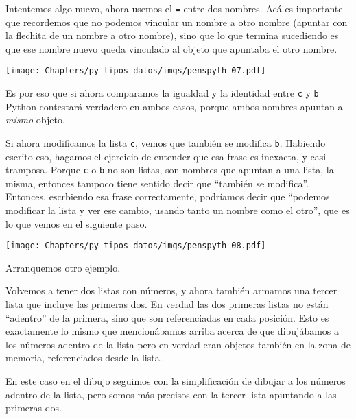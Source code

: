 Intentemos algo nuevo, ahora usemos el \verb|=| entre dos nombres. Acá es importante que recordemos que no podemos vincular un nombre a otro nombre (apuntar con la flechita de un nombre a otro nombre), sino que lo que termina sucediendo es que ese nombre nuevo queda vinculado al objeto que apuntaba el otro nombre.


\begin{center}
    \texttt{[image: Chapters/py\_tipos\_datos/imgs/penspyth-07.pdf]}
\end{center}

Es por eso que si ahora comparamos la igualdad y la identidad entre \verb|c| y \verb|b| Python contestará verdadero en ambos casos, porque ambos nombres apuntan al \textit{mismo} objeto.

Si ahora modificamos la lista \verb|c|, vemos que también se modifica \verb|b|. Habiendo escrito eso, hagamos el ejercicio de entender que esa frase es inexacta, y casi tramposa. Porque \verb|c| o \verb|b| no son listas, son nombres que apuntan a una lista, la misma, entonces tampoco tiene sentido decir que ``también se modifica''. Entonces, escrbiendo esa frase correctamente, podríamos decir que ``podemos modificar la lista y ver ese cambio, usando tanto un nombre como el otro'', que es lo que vemos en el siguiente paso.


\begin{center}
    \texttt{[image: Chapters/py\_tipos\_datos/imgs/penspyth-08.pdf]}
\end{center}

Arranquemos otro ejemplo. 

Volvemos a tener dos listas con números, y ahora también armamos una tercer lista que incluye las primeras dos. En verdad las dos primeras listas no están ``adentro'' de la primera, sino que son referenciadas en cada posición. Esto es exactamente lo mismo que mencionábamos arriba acerca de que dibujábamos a los números adentro de la lista pero en verdad eran objetos también en la zona de memoria, referenciados desde la lista. 

En este caso en el dibujo seguimos con la simplificación de dibujar a los números adentro de la lista, pero somos más precisos con la tercer lista apuntando a las primeras dos.

